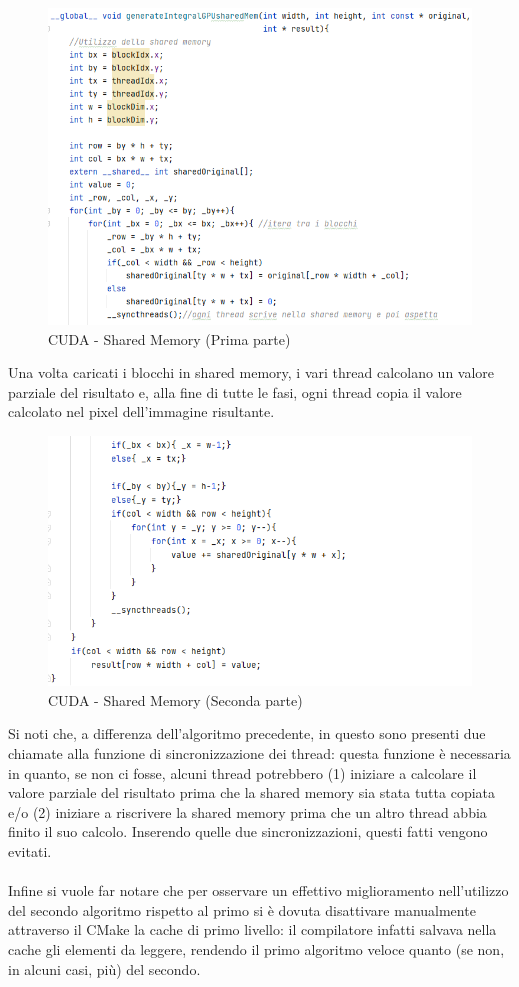 \documentclass[10pt,twocolumn,letterpaper]{article}
\begin{document}
\begin{figure}[H]
\includegraphics[width=1\linewidth]{code/cuda2_1.png} 
\caption{\small CUDA - Shared Memory (Prima parte)}
\label{cudacode2}
\end{figure}
Una volta caricati i blocchi in shared memory, i vari thread calcolano un valore parziale del risultato e, alla fine di tutte le fasi, ogni thread copia il valore calcolato nel pixel dell’immagine risultante.
\begin{figure}[H]
\includegraphics[width=1\linewidth]{code/cuda2_2.png} 
\caption{\small CUDA - Shared Memory (Seconda parte)}
\label{cudacode3}
\end{figure}
Si noti che, a differenza dell'algoritmo precedente, in questo sono presenti due chiamate alla funzione di sincronizzazione dei thread: questa funzione è necessaria in quanto, se non ci fosse, alcuni thread potrebbero (1) iniziare a calcolare il valore parziale del risultato prima che la shared memory sia stata tutta copiata e/o (2) iniziare a riscrivere la shared memory prima che un altro thread abbia finito il suo calcolo. Inserendo quelle due sincronizzazioni, questi fatti vengono evitati.\\
\\
Infine si vuole far notare che per osservare un effettivo miglioramento nell’utilizzo del secondo algoritmo rispetto al primo si è dovuta disattivare manualmente attraverso il CMake la cache di primo livello: il compilatore infatti salvava nella cache gli elementi da leggere, rendendo il primo algoritmo veloce quanto (se non, in alcuni casi, più) del secondo.
\end{document}
